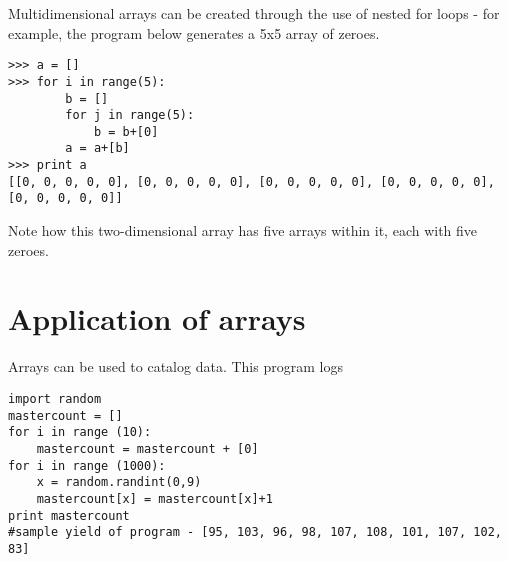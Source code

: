 Multidimensional arrays can be created through the use of nested for
loops - for example, the program below generates a 5x5 array of zeroes.

\begin{verbatim}
>>> a = [] 
>>> for i in range(5):     
		b = []     
		for j in range(5):         
			b = b+[0]     
		a = a+[b] 
>>> print a
[[0, 0, 0, 0, 0], [0, 0, 0, 0, 0], [0, 0, 0, 0, 0], [0, 0, 0, 0, 0], [0, 0, 0, 0, 0]]
\end{verbatim}

Note how this two-dimensional array has five arrays within it, each
with five zeroes.


\section{Application of arrays}

Arrays can be used to catalog data. This program logs 

\begin{verbatim}
import random
mastercount = []
for i in range (10):
    mastercount = mastercount + [0]
for i in range (1000):
    x = random.randint(0,9)
    mastercount[x] = mastercount[x]+1
print mastercount
#sample yield of program - [95, 103, 96, 98, 107, 108, 101, 107, 102, 83]
\end{verbatim}
